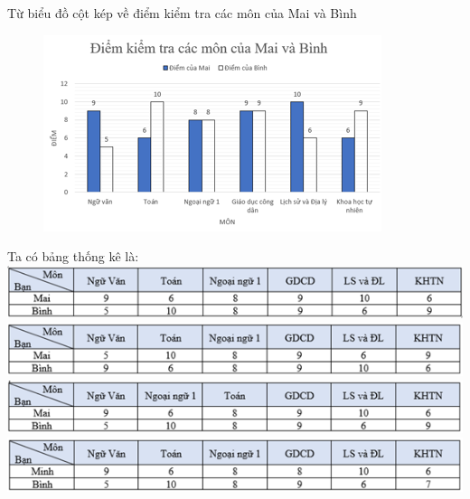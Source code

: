 \begin{ex}
	Từ biểu đồ cột kép về điểm kiểm tra các môn của Mai và Bình
	\begin{figure}[H]
		\centering
		\vspace*{-5pt}
		\captionsetup{labelformat= empty, justification=centering}
		\includegraphics[width=0.5\linewidth]{21}
		\vspace*{-10pt}
	\end{figure}
	Ta có bảng thống kê là:
	\choice
	{\includegraphics[width=0.9\linewidth]{b1}}
	{\includegraphics[width=0.9\linewidth]{b2}}
	{\includegraphics[width=0.9\linewidth]{b3}}
	{\includegraphics[width=0.9\linewidth]{b4}}
\end{ex}
